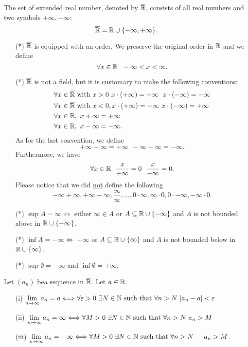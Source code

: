 \documentclass[a4paper]{article}
\begin{document}
The set of extended real number, denoted by \( \overline{\mathbb{R}} \), consists of all real numbers and two symbols \( +\infty, - \infty  \):
\[  \overline{\mathbb{R}} = \mathbb{R} \cup \{ - \infty  , + \infty  \}.  \]
\begin{enumerate}
    \item[(*)] \( \overline{\mathbb{R}} \) is equipped with an order. We preserve the original order in \( \mathbb{R}  \) and we define
        \[  \forall x \in \R  \ \ -\infty  < x < \infty. \]
    \item[(*)] \( \overline{\mathbb{R}} \) is not a field, but it is customary to make the following conventions:
    \begin{align*}
        &\forall x \in \overline{\mathbb{R}} \ \text{with} \ x > 0 \ x \cdot (+ \infty ) = + \infty \ \ x \cdot (- \infty ) = - \infty    \\
        &\forall x \in \overline{\mathbb{R}} \ \text{with} \ x < 0, x \cdot (+ \infty ) = - \infty  \ x \cdot (-\infty ) = +\infty \\ 
        &\forall x \in \mathbb{R}, \  x + \infty  = + \infty \\
        &\forall x \in \mathbb{R},  \ x - \infty  = - \infty.
    \end{align*}
    As for the last convention, we define
    \[ +  \infty  + \infty = + \infty  \ \ - \infty  - \infty  = - \infty.   \]
    Furthermore, we have 
    \[  \forall x \in \R \ \ \frac{ x  }{  + \infty  }  = 0 \ \ \frac{ x  }{  - \infty   }  = 0.  \]
    Please notice that we did \underline{not} define the following
    \[  - \infty  + \infty, + \infty  - \infty , \frac{ \infty    }{  \infty   } , \dots , 0 \cdot \infty  , \infty  \cdot 0 , 0 \cdot - \infty , - \infty  \cdot 0.  \]
\item[(*)] \( \sup A = \infty  \iff  \) either \( \infty  \in A  \) or \(  A \subseteq  \mathbb{R} \cup \{ - \infty \}    \) and \( A  \) is not bounded above in \( \mathbb{R} \cup \{ - \infty   \}  \). 
\item[(*)] \( \inf A = - \infty \iff   \) \( - \infty   \) or \( A \subseteq \mathbb{R} \cup \{  \infty   \}  \) and \( A  \) is not bounded below in \( \mathbb{R} \cup \{ \infty  \}  \). 
\item[(*)] \( \sup \emptyset = - \infty  \) and \( \inf \emptyset = + \infty  \).
\end{enumerate}
\begin{remark}
    Let \( ({a}_{n}) \) bea  sequence in \( \overline{\mathbb{R}} \). Let \( a \in \mathbb{R}  \).
    \begin{enumerate}
        \item[(i)] \( \lim_{ n \to \infty  }  {a}_{n} = a \iff \forall \epsilon > 0 \ \exists N \in \N \ \text{such that} \ \forall n > N \ | {a}_{n}- a   | < \epsilon \) \\
        \item[(ii)] \( \lim_{ n \to \infty  }  {a}_{n} = \infty \iff \forall M > 0 \ \exists N \in \N \ \text{such that} \ \forall n > N \ {a}_{n} > M  \) 
        \item[(iii)] \( \lim_{ n \to \infty  }  {a}_{n} = - \infty \iff \forall M > 0 \ \exists N \in \N \ \text{such that} \ \forall n > N \ - {a}_{n} > M  \).
    \end{enumerate}
\end{remark}
\end{document}
